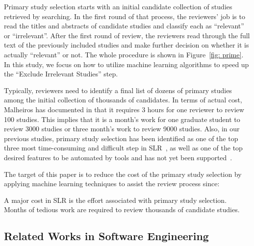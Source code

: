 \documentclass[final,twocolumn,5p]{elsarticle}
\theoremstyle{break}
\begin{document}
Primary study selection starts with an initial candidate collection of studies retrieved by searching. In the first round of that process,
the reviewers' job is to read the titles and abstracts of candidate studies and classify each as ``relevant'' or ``irrelevant''. After the first round of review, the reviewers read through the full text of the previously included studies and make further decision on whether it is actually ``relevant'' or not. The whole procedure is shown in Figure~\ref{fig: prime}. In this study, we focus on how to utilize machine learning algorithms to speed up the ``Exclude Irrelevant Studies'' step.

Typically, reviewers need to identify a final list of dozens of primary studies
among the initial collection of thousands of candidates. In terms of actual
cost, Malheiros has documented in \cite{malheiros2007visual} that it requires 3
hours for one reviewer to review 100 studies.  This implies that it is a month's
work for one graduate student to review 3000 studies or three month's work to
review 9000 studies. Also, in our previous studies, primary
study selection has been identified as one of the top three most time-consuming
and difficult step in SLR~\cite{carver2013identifying}, as well as one of the
top desired features to be automated by tools and has not yet been
supported~\cite{hassler2014outcomes,hassler2016identification,marshall2015tools,marshall2014tools}.


The target of this paper is to reduce the cost of the primary study selection by applying machine learning techniques to assist the review process since:

\begin{lesson}
    A major cost in SLR is the effort associated with primary study selection. Months of tedious work are required to review thousands of candidate studies.
\end{lesson}



\subsection{Related Works in Software Engineering}
\end{document}
